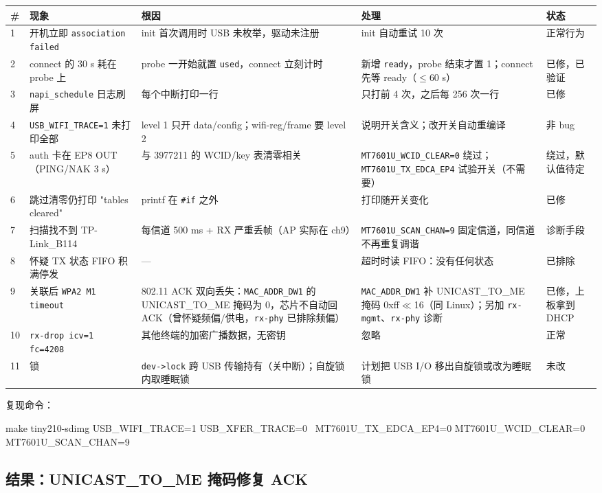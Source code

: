 \documentclass[UTF8,zihao=-4,fontset=none]{ctexart}
\newcommand{\fn}[1]{\texttt{#1}}
\begin{document}
\begin{longtable}{p{5mm}p{30mm}p{45mm}p{48mm}p{18mm}}
\toprule
\# & 现象 & 根因 & 处理 & 状态 \\ \midrule \endhead
1 & 开机立即 \fn{association failed} & init 首次调用时 USB 未枚举，驱动未注册 & init 自动重试 10 次 & 正常行为 \\
2 & connect 的 30 s 耗在 probe 上 & probe 一开始就置 \fn{used}，connect 立刻计时 & 新增 \fn{ready}，probe 结束才置 1；connect 先等 ready（$\le$60 s） & 已修，已验证 \\
3 & \fn{napi\_schedule} 日志刷屏 & 每个中断打印一行 & 只打前 4 次，之后每 256 次一行 & 已修 \\
4 & \fn{USB\_WIFI\_TRACE=1} 未打印全部 & level 1 只开 data/config；wifi-reg/frame 要 level 2 & 说明开关含义；改开关自动重编译 & 非 bug \\
5 & auth 卡在 EP8 OUT（PING/NAK 3 s） & 与 3977211 的 WCID/key 表清零相关 & \fn{MT7601U\_WCID\_CLEAR=0} 绕过；\fn{MT7601U\_TX\_EDCA\_EP4} 试验开关（不需要） & 绕过，默认值待定 \\
6 & 跳过清零仍打印 "tables cleared" & printf 在 \fn{\#if} 之外 & 打印随开关变化 & 已修 \\
7 & 扫描找不到 TP-Link\_B114 & 每信道 500 ms + RX 严重丢帧（AP 实际在 ch9） & \fn{MT7601U\_SCAN\_CHAN=9} 固定信道，同信道不再重复调谐 & 诊断手段 \\
8 & 怀疑 TX 状态 FIFO 积满停发 & — & 超时时读 FIFO：没有任何状态 & 已排除 \\
9 & 关联后 \fn{WPA2 M1 timeout} & 802.11 ACK 双向丢失：\fn{MAC\_ADDR\_DW1} 的 UNICAST\_TO\_ME 掩码为 0，芯片不自动回 ACK（曾怀疑频偏/供电，\fn{rx-phy} 已排除频偏） & \fn{MAC\_ADDR\_DW1} 补 UNICAST\_TO\_ME 掩码 0xff$\ll$16（同 Linux）；另加 \fn{rx-mgmt}、\fn{rx-phy} 诊断 & 已修，上板拿到 DHCP \\
10 & \fn{rx-drop icv=1 fc=4208} & 其他终端的加密广播数据，无密钥 & 忽略 & 正常 \\
11 & 锁 & \fn{dev->lock} 跨 USB 传输持有（关中断）；自旋锁内取睡眠锁 & 计划把 USB I/O 移出自旋锁或改为睡眠锁 & 未改 \\
\bottomrule
\end{longtable}

复现命令：

\begin{code}
make tiny210-sdimg USB_WIFI_TRACE=1 USB_XFER_TRACE=0 \
     MT7601U_TX_EDCA_EP4=0 MT7601U_WCID_CLEAR=0 MT7601U_SCAN_CHAN=9
\end{code}


\subsection{结果：UNICAST\_TO\_ME 掩码修复 ACK}
\end{document}
